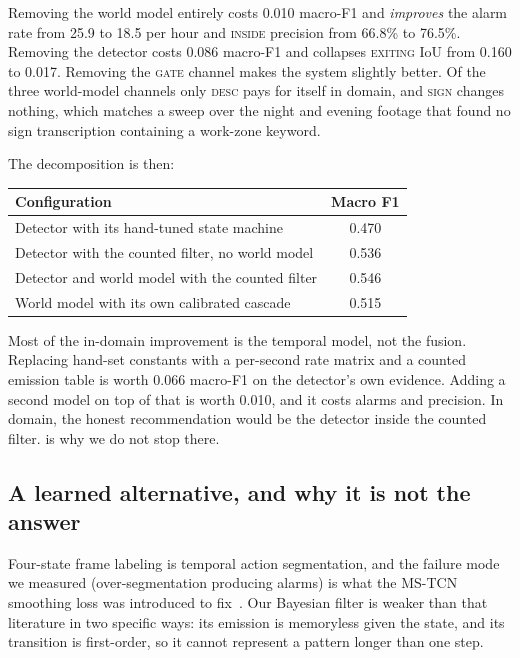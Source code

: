 \documentclass[journal]{IEEEtran}
\newcommand{\st}[1]{\textsc{#1}}
\begin{document}
Removing the world model entirely costs 0.010 macro-F1 and \emph{improves} the alarm rate from 25.9 to 18.5 per hour and \st{inside} precision from 66.8\% to 76.5\%.  Removing the detector costs 0.086 macro-F1 and collapses \st{exiting} IoU from 0.160 to 0.017.  Removing the \st{gate} channel makes the system slightly better.  Of the three world-model channels only \st{desc} pays for itself in domain, and \st{sign} changes nothing, which matches a sweep over the night and evening footage that found no sign transcription containing a work-zone keyword.

The decomposition is then:

\begin{center}
\footnotesize
\begin{tabular}{@{}lc@{}}
\toprule
Configuration & Macro F1 \\
\midrule
Detector with its hand-tuned state machine & 0.470 \\
Detector with the counted filter, no world model & 0.536 \\
Detector and world model with the counted filter & 0.546 \\
World model with its own calibrated cascade & 0.515 \\
\bottomrule
\end{tabular}
\end{center}

Most of the in-domain improvement is the temporal model, not the fusion. Replacing hand-set constants with a per-second rate matrix and a counted emission table is worth 0.066 macro-F1 on the detector's own evidence.  Adding a second model on top of that is worth 0.010, and it costs alarms and precision. In domain, the honest recommendation would be the detector inside the counted filter.   is why we do not stop there.

\subsection{A learned alternative, and why it is not the answer}
\label{sec:tcn}

Four-state frame labeling is temporal action segmentation, and the failure mode we measured (over-segmentation producing alarms) is what the MS-TCN smoothing loss was introduced to fix~\cite{farha2019mstcn}.  Our Bayesian filter is weaker than that literature in two specific ways: its emission is memoryless given the state, and its transition is first-order, so it cannot represent a pattern longer than one step.
\end{document}
